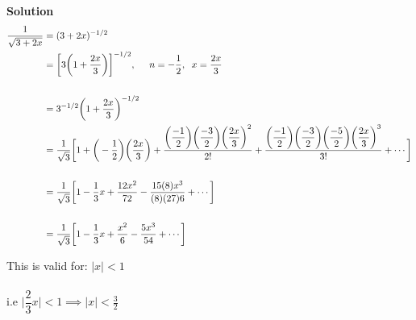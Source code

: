 \documentclass[11pt,a4paper]{article}
\begin{document}
\textbf{Solution}
\begin{align*}
\frac{1}{\sqrt{3+2x}} & = (3+2x)^{-1/2}\\
                      & = \bigg[3\bigg(1+\frac{2x}{3}\bigg)\bigg]^{-1/2},\hspace{0.5cm} n=-\frac{1}{2},\hspace{0.2cm} x=\frac{2x}{3}\\\\
                      & = 3^{-1/2}\bigg(1+\frac{2x}{3}\bigg)^{-1/2}\\
                      & = \frac{1}{\sqrt{3}}\bigg[1+\bigg(-\frac{1}{2}\bigg) \bigg(\frac{2x}{3}\bigg)+\frac{\bigg(\dfrac{-1}{2}\bigg) \bigg(\dfrac{-3}{2}\bigg) \bigg(\dfrac{2x}{3}\bigg)^2}{2!}+\frac{\bigg(\dfrac{-1}{2}\bigg)\bigg(\dfrac{-3}{2}\bigg)\bigg(\dfrac{-5}{2}\bigg)\bigg(\dfrac{2x}{3}\bigg)^3}{3!}+\cdots \bigg]\\\\
                      & = \frac{1}{\sqrt{3}}\bigg[1-\frac{1}{3}x+\frac{12x^2}{72}-\frac{15(8)x^3}{(8)(27)6}+\cdots \bigg]\\\\
                      & = \frac{1}{\sqrt{3}}\bigg[1-\frac{1}{3}x+\frac{x^2}{6}-\frac{5x^3}{54}+\cdots \bigg]\\
\end{align*}

This is valid for: $|x|<1$\\\\
i.e\hspace{0.2cm} $\bigg|\dfrac{2}{3}x\bigg|<1\implies |x|<\frac{3}{2}$\\\\\\
\end{document}
